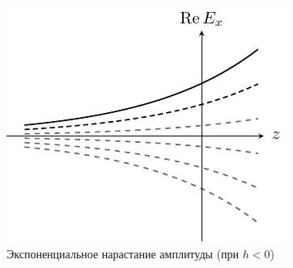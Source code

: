 \documentclass[a4paper,14pt]{extarticle}
\begin{document}
\begin{figure}[h!]
	\centering
	\includegraphics[scale=1]{img/lect3_ris3}
	\caption{Экспоненциальное нарастание амплитуды (при $h<0$)}
	\label{fig:lect3:3}
\end{figure}
\end{document}
